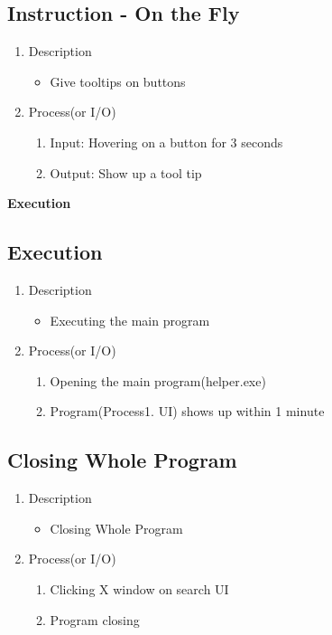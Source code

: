 \documentclass[conference]{IEEEtran}
\begin{document}
\textit{}

\subsection{Instruction - On the Fly}
\begin{enumerate}
  \item Description
  \begin{itemize}
    \item Give tooltips on buttons
  \end{itemize}
  \item Process(or I/O)
  \begin{enumerate}
    \item Input: Hovering on a button for 3 seconds
    \item Output: Show up a tool tip
  \end{enumerate}
\end{enumerate}

\textit{}

\textbf{Execution}

\subsection{Execution}
\begin{enumerate}
  \item Description
  \begin{itemize}
    \item Executing the main program
  \end{itemize}
  \item Process(or I/O)
  \begin{enumerate}
    \item Opening the main program(helper.exe)
    \item Program(Process1. UI) shows up within 1 minute
  \end{enumerate}
\end{enumerate}

\textit{}

\subsection{Closing Whole Program}
\begin{enumerate}
  \item Description
  \begin{itemize}
    \item Closing Whole Program
  \end{itemize}
  \item Process(or I/O)
  \begin{enumerate}
    \item Clicking X window on search UI
    \item Program closing
  \end{enumerate}
\end{enumerate}
\textit{}
\end{document}
